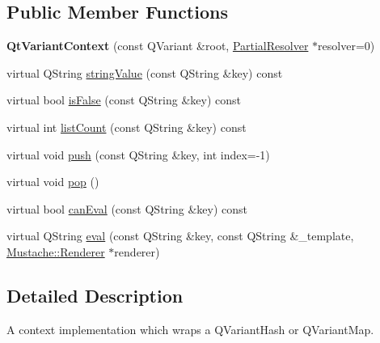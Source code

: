 \subsection*{Public Member Functions}
\begin{DoxyCompactItemize}
\item 
\hypertarget{classMustache_1_1QtVariantContext_ac9eff9d97c00dbcad6b38670327050ee}{{\bfseries Qt\+Variant\+Context} (const Q\+Variant \&root, \hyperlink{classMustache_1_1PartialResolver}{Partial\+Resolver} $\ast$resolver=0)}\label{classMustache_1_1QtVariantContext_ac9eff9d97c00dbcad6b38670327050ee}

\item 
virtual Q\+String \hyperlink{classMustache_1_1QtVariantContext_a55b19269efa6924edf21118ab0b49e08}{string\+Value} (const Q\+String \&key) const 
\item 
virtual bool \hyperlink{classMustache_1_1QtVariantContext_af5f93b6ff7ac3c24928757a2af1b8820}{is\+False} (const Q\+String \&key) const 
\item 
virtual int \hyperlink{classMustache_1_1QtVariantContext_aa055fefa606e0958549cb4671e628e9c}{list\+Count} (const Q\+String \&key) const 
\item 
virtual void \hyperlink{classMustache_1_1QtVariantContext_aa5164d437812877c96faa833d8ce5eac}{push} (const Q\+String \&key, int index=-\/1)
\item 
virtual void \hyperlink{classMustache_1_1QtVariantContext_adfb3067d5cf209e4203a0b1754008efc}{pop} ()
\item 
virtual bool \hyperlink{classMustache_1_1QtVariantContext_a2671990a3c9d8d4d7b626fa85b841ab2}{can\+Eval} (const Q\+String \&key) const 
\item 
virtual Q\+String \hyperlink{classMustache_1_1QtVariantContext_a0602be333afa1d4fa89c2c5820311bf1}{eval} (const Q\+String \&key, const Q\+String \&\+\_\+template, \hyperlink{classMustache_1_1Renderer}{Mustache\+::\+Renderer} $\ast$renderer)
\end{DoxyCompactItemize}


\subsection{Detailed Description}
A context implementation which wraps a Q\+Variant\+Hash or Q\+Variant\+Map. 

